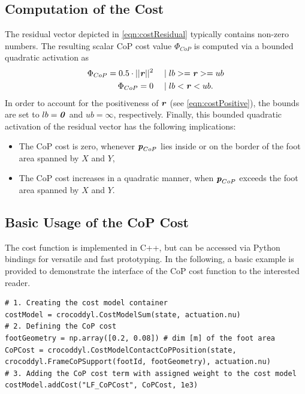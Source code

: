 \subsection{Computation of the Cost}
The residual vector depicted in \cref{eqn:costResidual} typically contains non-zero numbers. The resulting scalar \gls{CoP} cost value $\Phi_{CoP}$ is computed via a bounded quadratic activation as
\begin{align}
\begin{split}
\Phi_{CoP} = 0.5 \cdot ||\bm{\mathit{r}}||^2 \quad &\mid lb >= \bm{\mathit{r}} >= ub \\
\Phi_{CoP} = 0 \quad &\mid lb < \bm{\mathit{r}} < ub.
\end{split}
\end{align}
In order to account for the positiveness of $\bm{\mathit{r}}$ (see \cref{eqn:costPositive}), the bounds are set to $lb=\bm{\mathit{0}}$ and $ub=\infty$, respectively. Finally, this bounded quadratic activation of the residual vector has the following implications:
\begin{itemize}
\item The \gls{CoP} cost is zero, whenever $\bm{\mathit{p}}_{CoP}$ lies inside or on the border of the foot area spanned by $X$ and $Y$,
\item The \gls{CoP} cost increases in a quadratic manner, when $\bm{\mathit{p}}_{CoP}$ exceeds the foot area spanned by $X$ and $Y$.
\end{itemize}  

\subsection{Basic Usage of the CoP Cost}
The cost function is implemented in C++, but can be accessed via Python bindings for versatile and fast prototyping. In the following, a basic example is provided to demonstrate the interface of the \gls{CoP} cost function to the interested reader.
\begin{verbatim}
# 1. Creating the cost model container
costModel = crocoddyl.CostModelSum(state, actuation.nu)
# 2. Defining the CoP cost
footGeometry = np.array([0.2, 0.08]) # dim [m] of the foot area
CoPCost = crocoddyl.CostModelContactCoPPosition(state, 
crocoddyl.FrameCoPSupport(footId, footGeometry), actuation.nu)
# 3. Adding the CoP cost term with assigned weight to the cost model
costModel.addCost("LF_CoPCost", CoPCost, 1e3)
\end{verbatim}

